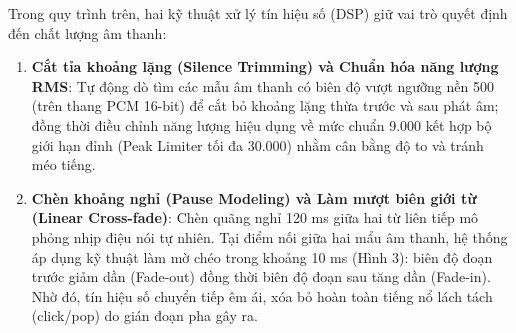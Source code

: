 Trong quy trình trên, hai kỹ thuật xử lý tín hiệu số (DSP) giữ vai trò quyết định đến chất lượng âm thanh:
\begin{enumerate}
    \item \textbf{Cắt tỉa khoảng lặng (Silence Trimming) và Chuẩn hóa năng lượng RMS}: Tự động dò tìm các mẫu âm thanh có biên độ vượt ngưỡng nền 500 (trên thang PCM 16-bit) để cắt bỏ khoảng lặng thừa trước và sau phát âm; đồng thời điều chỉnh năng lượng hiệu dụng về mức chuẩn 9.000 kết hợp bộ giới hạn đỉnh (Peak Limiter tối đa 30.000) nhằm cân bằng độ to và tránh méo tiếng.
    \item \textbf{Chèn khoảng nghỉ (Pause Modeling) và Làm mượt biên giới từ (Linear Cross-fade)}: Chèn quãng nghỉ 120 ms giữa hai từ liên tiếp mô phỏng nhịp điệu nói tự nhiên. Tại điểm nối giữa hai mẩu âm thanh, hệ thống áp dụng kỹ thuật làm mờ chéo trong khoảng 10 ms (Hình 3): biên độ đoạn trước giảm dần (Fade-out) đồng thời biên độ đoạn sau tăng dần (Fade-in). Nhờ đó, tín hiệu số chuyển tiếp êm ái, xóa bỏ hoàn toàn tiếng nổ lách tách (click/pop) do gián đoạn pha gây ra.
\end{enumerate}

